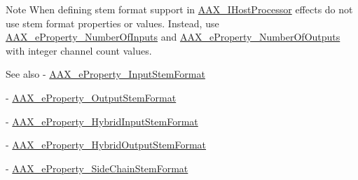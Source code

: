 \begin{DoxyNote}{Note}
When defining stem format support in \hyperlink{a00101}{A\+A\+X\+\_\+\+I\+Host\+Processor} effects do not use stem format properties or values. Instead, use \hyperlink{a00283_a6571f4e41a5dd06e4067249228e2249ea00ed3da39077c52ef259f350837fc981}{A\+A\+X\+\_\+e\+Property\+\_\+\+Number\+Of\+Inputs} and \hyperlink{a00283_a6571f4e41a5dd06e4067249228e2249eab7e07d482d3b6e527fc13bbc9f4eaf63}{A\+A\+X\+\_\+e\+Property\+\_\+\+Number\+Of\+Outputs} with integer channel count values.
\end{DoxyNote}
\begin{DoxySeeAlso}{See also}
-\/ \hyperlink{a00283_a6571f4e41a5dd06e4067249228e2249eadebf03028b758123965a8b988fa2df99}{A\+A\+X\+\_\+e\+Property\+\_\+\+Input\+Stem\+Format} 

-\/ \hyperlink{a00283_a6571f4e41a5dd06e4067249228e2249ea211fdc6277e7fa652b5d482e810b0bc9}{A\+A\+X\+\_\+e\+Property\+\_\+\+Output\+Stem\+Format} 

-\/ \hyperlink{a00335_ga6571f4e41a5dd06e4067249228e2249ea33a950bc2e02d38fc3be0a0ad8cc89b1}{A\+A\+X\+\_\+e\+Property\+\_\+\+Hybrid\+Input\+Stem\+Format} 

-\/ \hyperlink{a00335_ga6571f4e41a5dd06e4067249228e2249eac30a4e73772e37267dfef39ae3122705}{A\+A\+X\+\_\+e\+Property\+\_\+\+Hybrid\+Output\+Stem\+Format} 

-\/ \hyperlink{a00283_a6571f4e41a5dd06e4067249228e2249eae71ad10ce55fb8c4076fe70315b689ae}{A\+A\+X\+\_\+e\+Property\+\_\+\+Side\+Chain\+Stem\+Format} 
\end{DoxySeeAlso}

